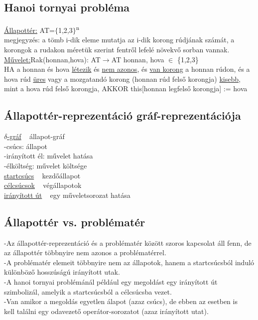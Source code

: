 \documentclass{article}
\begin{document}
	\subsection{Hanoi tornyai probléma}
	
	\underline{Állapottér:}
	AT=$\{$1,2,3$\}$\textsuperscript{n}\\
	megjegyzés: a tömb i-dik eleme mutatja az i-dik korong rúdjának számát, a korongok a rudakon méretük szerint fentről lefelé növekvő sorban vannak.\\	
	\underline{Művelet:}Rak(honnan,hova): AT$\rightarrow$AT honnan, hova $\in$ \{1,2,3\}\\
	HA a honnan és hova \underline{létezik} és \underline{nem azonos}, és \underline{van korong} a honnan rúdon, és a hova rúd \underline{üres} vagy a mozgatandó korong (honnan rúd felső korongja) \underline{kisebb}, mint a hova rúd felső korongja, AKKOR this[honnan legfelső korongja] := hova
	
	\newpage
	\subsection{Állapottér-reprezentáció gráf-reprezentációja}
	\underline{$\delta$-gráf} ~ állapot-gráf\\
	-csúcs: állapot\\
	-irányított él: művelet hatása\\
	-élköltség: művelet költsége\\
	\underline{startcsúcs} ~ kezdőállapot\\
	\underline{célcsúcsok} ~ végállapotok\\
	\underline{irányított út} ~ egy műveletsorozat hatása\\
	
	\subsection{Állapottér vs. problématér}
	-Az állapottér-reprezentáció és a problématér között szoros kapcsolat áll fenn, de az állapottér többnyire nem azonos a problématérrel.\\
	-A problématér elemeit többnyire nem az állapotok, hanem a startcsúcsból induló különböző hosszúságú irányított utak.\\
	\hspace*{1em} -A hanoi tornyai problémánál például egy megoldást egy irányított út\\ \hspace*{1em} szimbolizál, amelyik a startcsúcsból a célcsúcsba vezet.\\
	\hspace*{1em} -Van amikor a megoldás egyetlen álapot (azaz csúcs), de ebben az esetben is\\ \hspace*{1em} kell találni egy odavezető operátor-sorozatot (azaz irányított utat).
	 
\end{document}
